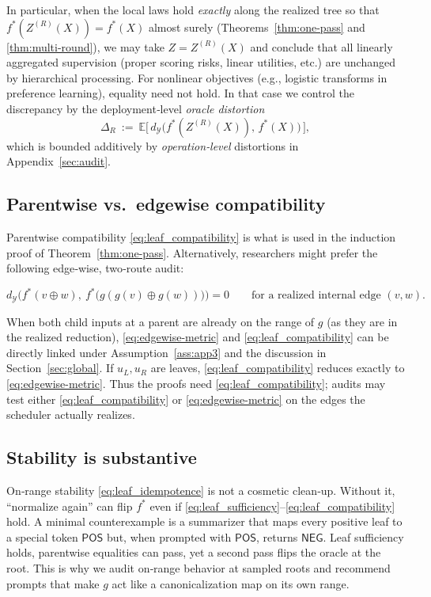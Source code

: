 \documentclass[11pt]{article}
\newcommand{\Y}{\mathcal{Y}}               %
\newcommand{\fstar}{f^*}               %
\newcommand{\E}{\mathbb{E}}
\newcommand{\concat}{\oplus}                    %
\newcommand{\metric}{d_{\Y}}
\begin{document}
In particular, when the local laws hold \emph{exactly} along the realized tree so that $\fstar(Z^{(R)}(X))=\fstar(X)$ almost surely (Theorems~\ref{thm:one-pass} and \ref{thm:multi-round}), we may take $Z=Z^{(R)}(X)$ and conclude that all linearly aggregated supervision (proper scoring risks, linear utilities, etc.) are unchanged by hierarchical processing. For nonlinear objectives (e.g., logistic transforms in preference learning), equality need not hold. In that case we control the discrepancy by the deployment‑level \emph{oracle distortion}
\[
\Delta_R\ :=\ \E\!\big[\,\metric\!\big(\fstar(Z^{(R)}(X)),\,\fstar(X)\big)\,\big],
\]
which is bounded additively by \emph{operation‑level} distortions in Appendix~\ref{sec:audit}.


\subsection{Parentwise vs.\ edgewise compatibility}\label{sec:parent-vs-edge}

Parentwise compatibility \eqref{eq:leaf_compatibility} is what is used in the induction proof of Theorem~\ref{thm:one-pass}. Alternatively, researchers might prefer the following edge‑wise, two‑route audit:

\begin{equation}\label{eq:edgewise-metric}\tag{Edge}
\metric\!\Big(\fstar(v\concat w),\ \fstar\big(g(g(v)\concat g(w))\big)\Big)=0
\qquad\text{for a realized internal edge }(v,w).
\end{equation}

When both child inputs at a parent are already on the range of $g$ (as they are in the realized reduction), \eqref{eq:edgewise-metric} and \eqref{eq:leaf_compatibility} can be directly linked under Assumption~\ref{ass:app3} and the discussion in Section~\ref{sec:global}. If $u_L,u_R$ are leaves, \eqref{eq:leaf_compatibility} reduces exactly to \eqref{eq:edgewise-metric}. Thus the proofs need \eqref{eq:leaf_compatibility}; audits may test either \eqref{eq:leaf_compatibility} or \eqref{eq:edgewise-metric} on the edges the scheduler actually realizes.

\subsection{Stability is substantive}
\label{sec:stability-caution}
On‑range stability \eqref{eq:leaf_idempotence} is not a cosmetic clean‑up. Without it, ``normalize again'' can flip $\fstar$ even if \eqref{eq:leaf_sufficiency}–\eqref{eq:leaf_compatibility} hold. A minimal counterexample is a summarizer that maps every positive leaf to a special token $\mathsf{POS}$ but, when prompted with $\mathsf{POS}$, returns $\mathsf{NEG}$. Leaf sufficiency holds, parentwise equalities can pass, yet a second pass flips the oracle at the root. This is why we audit on‑range behavior at sampled roots and recommend prompts that make $g$ act like a canonicalization map on its own range.
\end{document}
